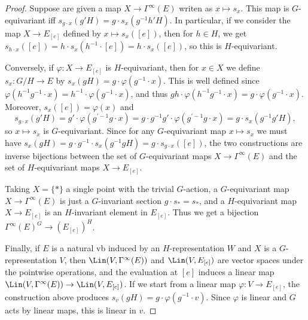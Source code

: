 \begin{proof}
    Suppose are given a map $X\to\Gamma^\infty(E)$ writen as $x\mapsto  s_x$. This map is $G$-equivariant iff $ s_{g\cdot x}(g'H)=g\cdot s_x(g^{-1}h'H)$. In particular, if we consider the map $X\to E_{[e]}$ defined by $x\mapsto  s_x([e])$, then for $h\in H$, we get $ s_{h\cdot x}([e])=h\cdot  s_x(h^{-1}\cdot[e])=h\cdot s_x([e])$, so this is $H$-equivariant. 
    
    Conversely, if $\varphi:X\to E_{[e]}$ is $H$-equivariant, then for $x\in X$ we define $ s_x:G\slash H\to E$ by $ s_x(gH)=g\cdot \varphi(g^{-1}\cdot x)$. This is well defined since $\varphi(h^{-1}g^{-1}\cdot x)=h^{-1}\cdot \varphi(g^{-1}\cdot x)$, and thus $gh\cdot \varphi(h^{-1}g^{-1}\cdot x)=g\cdot \varphi(g^{-1}\cdot x)$. Moreover, $ s_x([e])=\varphi(x)$ and 
    \[ s_{g\cdot x}(g'H)=g'\cdot \varphi(g^{\prime-1}g\cdot x)=g\cdot g^{-1}g'\cdot \varphi(g^{\prime-1}g\cdot x)=g\cdot s_x(g^{-1}g'H),\]
    so $x\mapsto  s_x$ is $G$-equivariant. Since for any $G$-equivariant map $x\mapsto  s_x$ we must have $ s_x(gH)=g\cdot g^{-1}\cdot  s_x(g^{-1}gH)=g\cdot  s_{g\cdot x}([e])$, the two constructions are inverse bijections between the set of $G$-equivariant maps $X\to \Gamma^\infty(E)$ and the set of $H$-equivariant maps $X\to E_{[e]}$.

    Taking $X=\{*\}$ a single point with the trivial $G$-action, a $G$-equivariant map $X\to \Gamma^\infty(E)$ is just a $G$-invariant section $g\cdot  s_*= s_*$, and a $H$-equivariant map $X\to E_{[e]}$ is an $H$-invariant element in $E_{[e]}$. Thus we get a bijection $\Gamma^\infty(E)^G\to (E_{[e]})^H$.

    Finally, if $E$ is a natural \gls{vb} induced by an $H$-representation $W$ and $X$ is a $G$-representation $V$, then $\Lin(V,\Gamma^\infty(E))$ and $\Lin(V,E_{[e]})$ are vector spaces under the pointwise operations, and the evaluation at $[e]$ induces a linear map $\Lin(V,\Gamma^\infty(E))\to \Lin(V,E_{[e]})$. If we start from a linear map $\varphi:V\to E_{[e]}$, the construction above produces $ s_v(gH)=g\cdot \varphi(g^{-1}\cdot v)$. Since $\varphi$ is linear and $G$ acts by linear maps, this is linear in $v$.
\end{proof}

